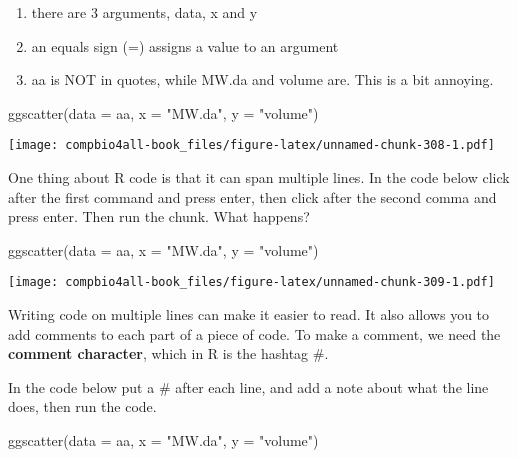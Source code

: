 \documentclass[
]{book}
\newenvironment{Shaded}{\begin{snugshade}}{\end{snugshade}}
\newcommand{\AttributeTok}[1]{\textcolor[rgb]{0.77,0.63,0.00}{#1}}
\newcommand{\FunctionTok}[1]{\textcolor[rgb]{0.00,0.00,0.00}{#1}}
\newcommand{\NormalTok}[1]{#1}
\newcommand{\StringTok}[1]{\textcolor[rgb]{0.31,0.60,0.02}{#1}}
\providecommand{\tightlist}{%
  \setlength{\itemsep}{0pt}\setlength{\parskip}{0pt}}
\begin{document}
\begin{enumerate}
\def\labelenumi{\arabic{enumi}.}
\tightlist
\item
  there are 3 arguments, data, x and y
\item
  an equals sign (=) assigns a value to an argument
\item
  aa is NOT in quotes, while MW.da and volume are. This is a bit annoying.
\end{enumerate}

\begin{Shaded}
\begin{Highlighting}[]
\FunctionTok{ggscatter}\NormalTok{(}\AttributeTok{data =}\NormalTok{ aa, }\AttributeTok{x =} \StringTok{"MW.da"}\NormalTok{, }\AttributeTok{y =} \StringTok{"volume"}\NormalTok{)}
\end{Highlighting}
\end{Shaded}

\texttt{[image: compbio4all-book\_files/figure-latex/unnamed-chunk-308-1.pdf]}

One thing about R code is that it can span multiple lines. In the code below click after the first command and press enter, then click after the second comma and press enter. Then run the chunk. What happens?

\begin{Shaded}
\begin{Highlighting}[]
\FunctionTok{ggscatter}\NormalTok{(}\AttributeTok{data =}\NormalTok{ aa, }\AttributeTok{x =} \StringTok{"MW.da"}\NormalTok{, }\AttributeTok{y =} \StringTok{"volume"}\NormalTok{)}
\end{Highlighting}
\end{Shaded}

\texttt{[image: compbio4all-book\_files/figure-latex/unnamed-chunk-309-1.pdf]}

Writing code on multiple lines can make it easier to read. It also allows you to add comments to each part of a piece of code. To make a comment, we need the \textbf{comment character}, which in R is the hashtag \#.

In the code below put a \# after each line, and add a note about what the line does, then run the code.

\begin{Shaded}
\begin{Highlighting}[]
\FunctionTok{ggscatter}\NormalTok{(}\AttributeTok{data =}\NormalTok{ aa, }
          \AttributeTok{x =} \StringTok{"MW.da"}\NormalTok{, }
          \AttributeTok{y =} \StringTok{"volume"}\NormalTok{)}
\end{Highlighting}
\end{Shaded}
\end{document}
